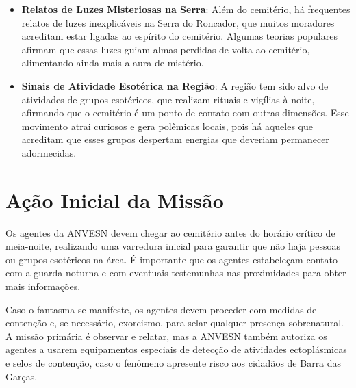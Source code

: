 \begin{itemize}
    \item \textbf{Relatos de Luzes Misteriosas na Serra}: Além do cemitério, há frequentes relatos de luzes inexplicáveis na Serra do Roncador, que muitos moradores acreditam estar ligadas ao espírito do cemitério. Algumas teorias populares afirmam que essas luzes guiam almas perdidas de volta ao cemitério, alimentando ainda mais a aura de mistério.

    \item \textbf{Sinais de Atividade Esotérica na Região}: A região tem sido alvo de atividades de grupos esotéricos, que realizam rituais e vigílias à noite, afirmando que o cemitério é um ponto de contato com outras dimensões. Esse movimento atrai curiosos e gera polêmicas locais, pois há aqueles que acreditam que esses grupos despertam energias que deveriam permanecer adormecidas.

\end{itemize}

\section{Ação Inicial da Missão}
Os agentes da ANVESN devem chegar ao cemitério antes do horário crítico de meia-noite, realizando uma varredura inicial para garantir que não haja pessoas ou grupos esotéricos na área. É importante que os agentes estabeleçam contato com a guarda noturna e com eventuais testemunhas nas proximidades para obter mais informações.

Caso o fantasma se manifeste, os agentes devem proceder com medidas de contenção e, se necessário, exorcismo, para selar qualquer presença sobrenatural. A missão primária é observar e relatar, mas a ANVESN também autoriza os agentes a usarem equipamentos especiais de detecção de atividades ectoplásmicas e selos de contenção, caso o fenômeno apresente risco aos cidadãos de Barra das Garças.



